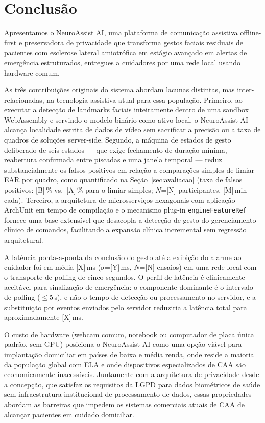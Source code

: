 
\section{Conclusão}
\label{sec:conclusao}

Apresentamos o NeuroAssist AI, uma plataforma de comunicação assistiva
offline-first e preservadora de privacidade que transforma gestos faciais residuais
de pacientes com esclerose lateral amiotrófica em estágio avançado em alertas de
emergência estruturados, entregues a cuidadores por uma rede local usando hardware
comum.

As três contribuições originais do sistema abordam lacunas distintas, mas
inter-relacionadas, na tecnologia assistiva atual para essa população. Primeiro, ao
executar a detecção de landmarks faciais inteiramente dentro de uma sandbox
WebAssembly e servindo o modelo binário como ativo local, o NeuroAssist AI alcança
localidade estrita de dados de vídeo sem sacrificar a precisão ou a taxa de quadros
de soluções server-side. Segundo, a máquina de estados de gesto deliberado de seis
estados — que exige fechamento de duração mínima, reabertura confirmada entre piscadas
e uma janela temporal — reduz substancialmente os falsos positivos em relação a
comparações simples de limiar EAR por quadro, como quantificado na
Seção~\ref{sec:avaliacao} (taxa de falsos positivos: [B]\,\% vs.\ [A]\,\% para o
limiar simples; $N$=[N] participantes, [M]\,min cada). Terceiro, a arquitetura de
microsserviços hexagonais com aplicação ArchUnit em tempo de compilação e o mecanismo
plug-in \texttt{engineFeatureRef} fornece uma base extensível que desacopla a detecção
de gesto do gerenciamento clínico de comandos, facilitando a expansão clínica
incremental sem regressão arquitetural.

A latência ponta-a-ponta da conclusão do gesto até a exibição do alarme ao cuidador
foi em média [X]\,ms ($\sigma$=[Y]\,ms, $N$=[N] ensaios) em uma rede local com o
transporte de polling de cinco segundos. O perfil de latência é clinicamente aceitável
para sinalização de emergência: o componente dominante é o intervalo de polling
($\leq$5\,s), e não o tempo de detecção ou processamento no servidor, e a substituição
por eventos enviados pelo servidor reduziria a latência total para aproximadamente
[X]\,ms.

O custo de hardware (webcam comum, notebook ou computador de placa única padrão, sem
GPU) posiciona o NeuroAssist AI como uma opção viável para implantação domiciliar em
países de baixa e média renda, onde reside a maioria da população global com ELA e
onde dispositivos especializados de CAA são economicamente inacessíveis. Juntamente
com a arquitetura de privacidade desde a concepção, que satisfaz os requisitos da
LGPD para dados biométricos de saúde sem infraestrutura institucional de processamento
de dados, essas propriedades abordam as barreiras que impedem os sistemas comerciais
atuais de CAA de alcançar pacientes em cuidado domiciliar.

